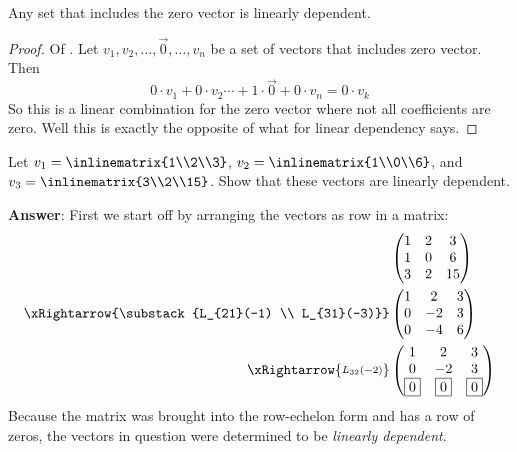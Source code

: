 \begin{thm}\label{thm-zero-vector-linearly-dependent}
	Any set that includes the zero vector is linearly dependent.
\end{thm}

\begin{proof}
	Of . Let
	$v_1,v_2,\dots,\vec{0},\dots,v_n$ be a set of vectors that includes
	zero vector. Then
	\begin{equation*}
		0 \cdot v_1 + 0 \cdot v_2 \cdots + 1\cdot\vec{0} + 0 \cdot v_n = 0 \cdot v_k
	\end{equation*}
	So this is a linear combination for the zero vector where not all coefficients
	are zero. Well this is exactly the opposite of what 
	for linear dependency says.
\end{proof}

\begin{exm}
	Let
	$v_1=\inlinematrix{1\\2\\3}$, $v_2=\inlinematrix{1\\0\\6}$, and
	$v_3=\inlinematrix{3\\2\\15}$.
	Show that these vectors are linearly dependent.
	\begin{flushleft}
		\textbf{Answer}:
		First we start off by arranging the vectors as row in a matrix:
		\begin{align*}
			 & \begin{pmatrix}
				1 & 2 & 3  \\
				1 & 0 & 6  \\
				3 & 2 & 15
			\end{pmatrix}     \\
			\xRightarrow{\substack{L_{21}(-1) \\ L_{31}(-3)}}
			 & \begin{pmatrix}
				1 & 2  & 3 \\
				0 & -2 & 3 \\
				0 & -4 & 6
			\end{pmatrix}     \\
			\xRightarrow{\substack{L_{32}(-2)}}
			 & \begin{pmatrix}
				1         & 2         & 3         \\
				0         & -2        & 3         \\
				\boxed{0} & \boxed{0} & \boxed{0}
			\end{pmatrix}
		\end{align*}
		Because the matrix was brought into the row-echelon form and has a row
		of zeros, the vectors in question were determined to be \textit{linearly dependent}.
	\end{flushleft}
\end{exm}

